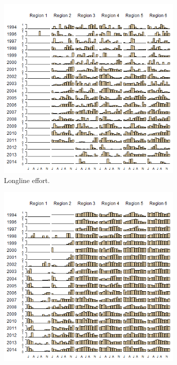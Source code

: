 \documentclass[12pt]{SCreport}
\begin{document}
\begin{landscape}
\begin{figure}
\centering
   \begin{subfigure}[b]{0.6\textwidth}
       \includegraphics[width=\textwidth]{../GRAPHICS/Defined/FIG_06a_obsBY_mm_RDS}
       \caption{Longline effort.}
       \label{fig:fig06a}
   \end{subfigure}
   \begin{subfigure}[b]{0.6\textwidth}
       \includegraphics[width=\textwidth]{../GRAPHICS/Defined/FIG_06b_LOGSHEET_mm_RDS}

\end{subfigure}
\end{figure}
\end{landscape}
\end{document}
